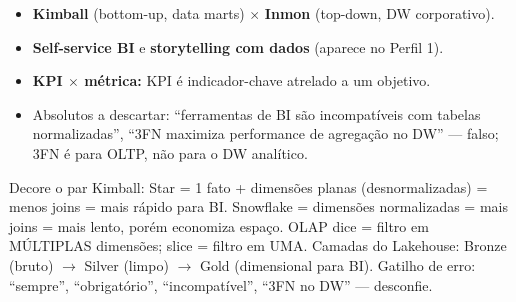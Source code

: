 \begin{itemize}
\item \textbf{Kimball} (bottom-up, data marts) $\times$ \textbf{Inmon}
(top-down, DW corporativo).
\item \textbf{Self-service BI} e \textbf{storytelling com dados} (aparece no
Perfil 1).
\item \textbf{KPI $\times$ métrica:} KPI é indicador-chave atrelado a um
objetivo.
\item Absolutos a descartar: ``ferramentas de BI são incompatíveis com
tabelas normalizadas'', ``3FN maximiza performance de agregação no DW'' ---
falso; 3FN é para OLTP, não para o DW analítico.
\end{itemize}

\begin{comosair}
Decore o par Kimball: Star = 1 fato + dimensões planas (desnormalizadas) =
menos joins = mais rápido para BI. Snowflake = dimensões normalizadas = mais
joins = mais lento, porém economiza espaço. OLAP dice = filtro em MÚLTIPLAS
dimensões; slice = filtro em UMA. Camadas do Lakehouse: Bronze (bruto) $\to$
Silver (limpo) $\to$ Gold (dimensional para BI). Gatilho de erro: ``sempre'',
``obrigatório'', ``incompatível'', ``3FN no DW'' --- desconfie.
\end{comosair}
